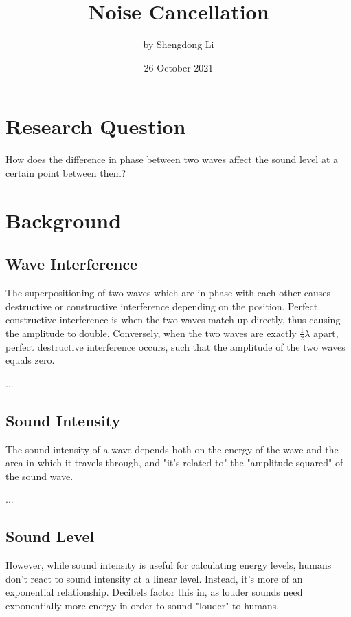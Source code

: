 \documentclass[index]{subfiles}
\begin{document}
\title{Noise Cancellation}
\author{by Shengdong Li}
\date{26 October 2021}
\maketitle

\section{Research Question}

How does the difference in phase between two waves affect the sound level at a certain point between them?

\section{Background}

\subsection{Wave Interference}

The superpositioning of two waves which are in phase with each other causes destructive or constructive interference depending on the position. Perfect constructive interference is when the two waves match up directly, thus causing the amplitude to double. Conversely, when the two waves are exactly \(\frac{1}{2}\lambda\) apart, perfect destructive interference occurs, such that the amplitude of the two waves equals zero. \cite{openstax}

...

\subsection{Sound Intensity}

The sound intensity of a wave depends both on the energy of the wave and the area in which it travels through, and "it's related to" the "amplitude squared" of the sound wave.

...

\subsection{Sound Level}

However, while sound intensity is useful for calculating energy levels, humans don't react to sound intensity at a linear level. Instead, it's more of an exponential relationship. Decibels factor this in, as louder sounds need exponentially more energy in order to sound "louder" to humans.
\end{document}
